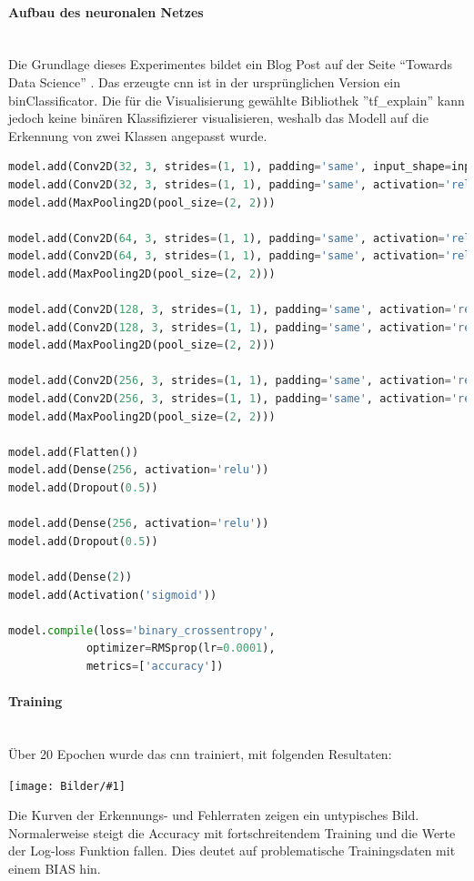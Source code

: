 \documentclass[
  12pt, %
  a4paper, %
  oneside, %
  openany, 
  numbers=noenddot, %
  BCOR=5mm, %
  parskip=half*, %
  thesis, %
]{bfhbook}
\newcommand{\parag}[1]{\paragraph*{#1}\mbox{}\\}
\newcommand{\imgText}[3]{
\begin{center}
    \begin{minipage}[t]{0.6\textwidth}
    		\vspace{0pt}
		\texttt{[image: Bilder/\#1]}
		\captionof{figure}{#2}
	\end{minipage}\hfill
    \begin{minipage}[t]{0.4\textwidth}
    		\vspace{5pt}
  		#3
    \end{minipage}
\end{center}
}
\begin{document}
\parag{Aufbau des neuronalen Netzes}

Die Grundlage dieses Experimentes bildet ein Blog Post auf der Seite ``Towards Data Science''  \cite{dogVsCats}. Das erzeugte \acrshort{cnn} ist in der ursprünglichen Version ein \gls{binClassificator}. Die für die Visualisierung gewählte Bibliothek ''tf\_explain'' \cite{tfExplain} kann jedoch keine binären Klassifizierer visualisieren, weshalb das Modell auf die Erkennung von zwei Klassen angepasst wurde.

\begin{lstlisting}[language=Python, caption=CNN für Dog vs. Cats]
model.add(Conv2D(32, 3, strides=(1, 1), padding='same', input_shape=input_shape, activation='relu'))
model.add(Conv2D(32, 3, strides=(1, 1), padding='same', activation='relu'))
model.add(MaxPooling2D(pool_size=(2, 2)))

model.add(Conv2D(64, 3, strides=(1, 1), padding='same', activation='relu'))
model.add(Conv2D(64, 3, strides=(1, 1), padding='same', activation='relu'))
model.add(MaxPooling2D(pool_size=(2, 2)))

model.add(Conv2D(128, 3, strides=(1, 1), padding='same', activation='relu'))
model.add(Conv2D(128, 3, strides=(1, 1), padding='same', activation='relu'))
model.add(MaxPooling2D(pool_size=(2, 2)))

model.add(Conv2D(256, 3, strides=(1, 1), padding='same', activation='relu'))
model.add(Conv2D(256, 3, strides=(1, 1), padding='same', activation='relu'))
model.add(MaxPooling2D(pool_size=(2, 2)))

model.add(Flatten())
model.add(Dense(256, activation='relu'))
model.add(Dropout(0.5))

model.add(Dense(256, activation='relu'))
model.add(Dropout(0.5))

model.add(Dense(2))
model.add(Activation('sigmoid'))
    
model.compile(loss='binary_crossentropy',
            optimizer=RMSprop(lr=0.0001),
            metrics=['accuracy'])
\end{lstlisting}

\parag{Training}
Über 20 Epochen wurde das \acrshort{cnn} trainiert, mit folgenden Resultaten:
\imgText{Training-Manipulated-LogLoss.png}{Log-loss / Accuracy Dog vs. Cat}{
Die Kurven der Erkennungs- und Fehlerraten zeigen ein untypisches Bild. Normalerweise steigt die Accuracy mit fortschreitendem Training und die Werte der Log-loss Funktion fallen. Dies deutet auf problematische Trainingsdaten mit einem \Gls{BIAS} hin.
}
\end{document}
